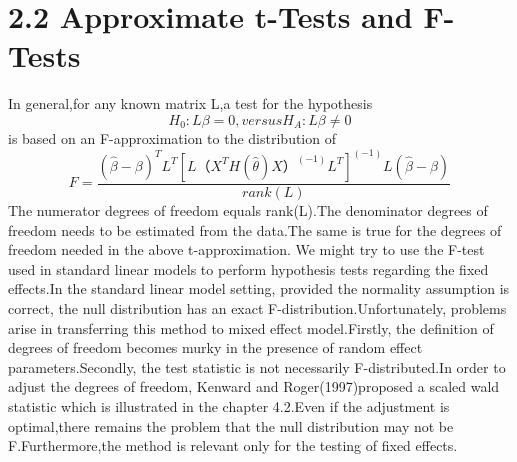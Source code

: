 \documentclass[a4paper,11pt]{article}
\begin{document}
\section{2.2 Approximate t-Tests and F-Tests}
In general,for any known matrix L,a test for the hypothesis
\begin{equation}\label{eq:8} 
         H_0 : L\beta = 0, versus H_A: L\beta \neq 0
\end{equation}
is based on an F-approximation to the distribution of
\begin{equation}\label{eq:9}
F = \frac{(\widehat{\beta}-\beta)^T L^T [L（X^T H(\widehat{\theta}) X）^(-1) L^T]^(-1) L(\widehat{\beta}-\beta)}{rank(L)}
\end{equation}
The numerator degrees of freedom equals rank(L).The denominator degrees of freedom needs to be estimated from the data.The same is true for the degrees of freedom needed in the above t-approximation. We might try to use the F-test used in standard linear models to perform hypothesis tests regarding the fixed effects.In the standard linear model setting, provided the normality assumption is correct, the null distribution has an exact F-distribution.Unfortunately, problems arise in transferring this method to mixed effect model.Firstly, the definition of degrees of freedom becomes murky in the presence of random effect parameters.Secondly, the test statistic is not necessarily F-distributed.In order to adjust the degrees of freedom, Kenward and Roger(1997)proposed a scaled wald statistic which is illustrated in the chapter 4.2.Even if the adjustment is optimal,there remains the problem that the null distribution may not be F.Furthermore,the method is relevant only for the testing of fixed effects.
\end{document}
